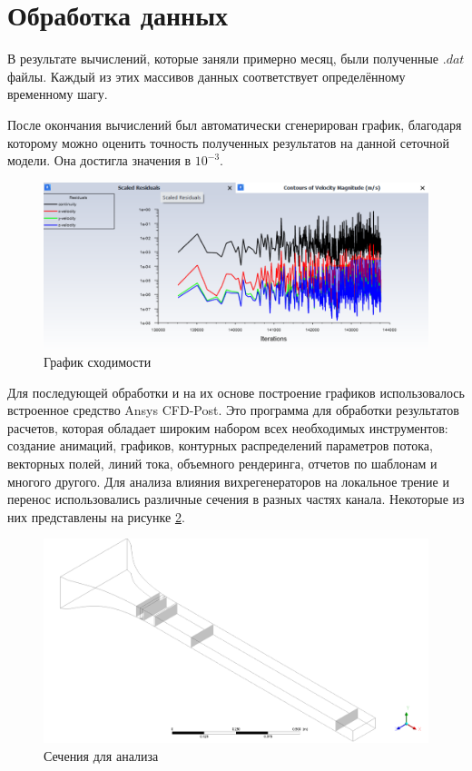\section{Обработка данных}
	В результате вычислений, которые заняли примерно месяц, были полученные $.dat$ файлы. Каждый из этих массивов данных соответствует определённому временному шагу. 
	
	После окончания вычислений был автоматически сгенерирован график, благодаря которому можно оценить точность полученных результатов на данной сеточной модели. Она достигла значения в $10^{-3}$.
	\begin{figure}[H]
		\centering
		\includegraphics[width=1\linewidth]{../Assets/scaledResiduals}
		\caption{График сходимости}
		\label{fig:scaledresiduals}
	\end{figure}
	
	Для последующей обработки и на их основе построение графиков использовалось встроенное средство Ansys CFD-Post. Это программа для обработки результатов расчетов, которая обладает широким набором всех необходимых инструментов: создание анимаций, графиков, контурных распределений параметров потока, векторных полей, линий тока, объемного рендеринга, отчетов по шаблонам и многого другого. Для анализа влияния вихрегенераторов на локальное трение и перенос использовались различные сечения в разных частях канала. Некоторые из них представлены на рисунке \ref{fig:planesforanalysis}. 
	\begin{figure}[H]
		\centering
		\includegraphics[width=0.9\linewidth]{../Assets/1}
		\caption{Сечения для анализа}
		\label{fig:planesforanalysis}
	\end{figure}
	
